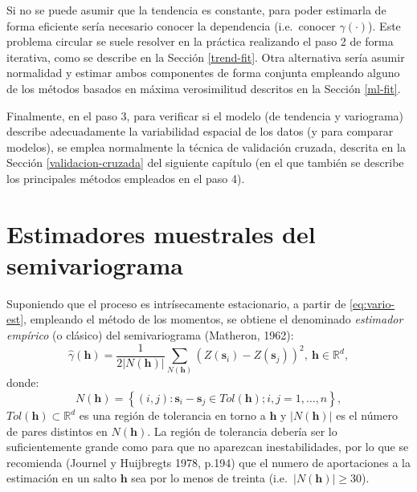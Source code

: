 \documentclass[
]{book}
\theoremstyle{break}
\theoremstyle{definition}
\theoremstyle{definition}
\theoremstyle{definition}
\theoremstyle{definition}
\theoremstyle{remark}
\begin{document}
Si no se puede asumir que la tendencia es constante, para poder estimarla de forma eficiente sería necesario conocer la dependencia (i.e.~conocer \(\gamma(\cdot)\)).
Este problema circular se suele resolver en la práctica realizando el paso 2 de forma iterativa, como se describe en la Sección \ref{trend-fit}.
Otra alternativa sería asumir normalidad y estimar ambos componentes de forma conjunta empleando alguno de los métodos basados en máxima verosimilitud descritos en la Sección \ref{ml-fit}.

Finalmente, en el paso 3, para verificar si el modelo (de tendencia y variograma) describe adecuadamente la variabilidad espacial de los datos (y para comparar modelos), se emplea normalmente la técnica de validación cruzada, descrita en la Sección \ref{validacion-cruzada} del siguiente capítulo (en el que también se describe los principales métodos empleados en el paso 4).

\section{Estimadores muestrales del semivariograma}\label{vario-muestrales}

Suponiendo que el proceso es intrísecamente estacionario, a partir de \eqref{eq:vario-est}, empleando el método de los momentos, se obtiene el denominado \emph{estimador empírico} (o clásico) del semivariograma (Matheron, 1962):
\[\hat{\gamma}(\mathbf{h}) = \dfrac{1}{2\left| N(\mathbf{h})\right| }
\sum\limits_{N(\mathbf{h})}\left( Z(\mathbf{s}_{i})-Z(\mathbf{s}_{j} )\right) ^2 ,\ \mathbf{h}\in \mathbb{R}^{d},\]
donde:
\[N(\mathbf{h}) = \left\{ (i,j):\mathbf{s}_{i} -\mathbf{s}_{j} \in Tol(\mathbf{h});i,j=1,\ldots,n\right\},\]
\(Tol(\mathbf{h})\subset \mathbb{R}^{d}\) es una región de tolerancia en torno a \(\mathbf{h}\) y \(\left| N(\mathbf{h})\right|\) es el número de pares distintos en \(N(\mathbf{h})\).
La región de tolerancia debería ser lo suficientemente grande como para que no aparezcan inestabilidades, por lo que se recomienda (Journel y Huijbregts 1978, p.194) que el numero de aportaciones a la estimación en un salto \(\mathbf{h}\) sea por lo menos de treinta (i.e.~\(\left| N(\mathbf{h})\right| \geq 30\)).
\end{document}
